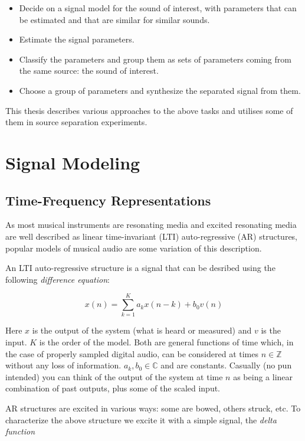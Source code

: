 \documentclass[letterpaper,12pt]{report}
\begin{document}
\begin{itemize}
    \item
        Decide on a signal model for the sound of interest, with parameters that
        can be estimated and that are similar for similar sounds.
    \item
        Estimate the signal parameters.
    \item
        Classify the parameters and group them as sets of parameters coming from
        the same source: the sound of interest.
    \item
        Choose a group of parameters and synthesize the separated signal from
        them.
\end{itemize}

This thesis describes various approaches to the above tasks and utilises some of
them in source separation experiments.

\section{Signal Modeling}

\subsection{Time-Frequency Representations}

As most musical instruments are resonating media and excited resonating media
are well described as linear time-invariant (LTI) auto-regressive (AR)
structures, popular models of musical audio are some variation of this
description.

An LTI auto-regressive structure is a signal that can be desribed using the
following \textit{difference equation}:

\begin{equation}
    x(n) = \sum_{k=1}^{K} a_k x(n-k) + b_0 v(n)
\end{equation}

Here $x$ is the output of the system (what is heard or measured) and $v$ is the
input. $K$ is the order of the model. Both are general functions of time which,
in the case of properly sampled digital audio, can be considered at times $n \in
\mathbb{Z}$ without any loss of information. $a_k,b_0 \in \mathbb{C}$ and are
constants. Casually (no pun intended) you can think of the output of the system
at time $n$ as being a linear combination of past outputs, plus some of the
scaled input.

AR structures are excited in various ways: some are bowed, others struck, etc.
To characterize the above structure we excite it with a simple signal, the
\textit{delta function}
\end{document}
